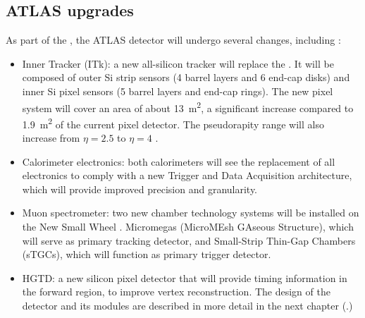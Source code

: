 \subsection{ATLAS upgrades}\label{subsec:ATLAS_upgrades}

As part of the , the ATLAS detector will undergo several changes, including \cite{MANGHI2024169917}: %

\begin{itemize}
    \item Inner Tracker (ITk): a new all-silicon tracker will replace the . It will be composed of outer Si strip sensors (4 barrel layers and 6 end-cap disks) and inner Si pixel sensors (5 barrel layers and end-cap rings). The new pixel system will cover an area of about \qty{13}{\meter^2}, a significant increase compared to \qty{1.9}{\meter^2} of the current pixel detector. The pseudorapity range will also increase from $\eta=2.5$ to $\eta=4$ \cite{Buttar:2024imj}.
    \item Calorimeter electronics: both calorimeters will see the replacement of all electronics to comply with a new Trigger and Data Acquisition architecture, which will provide improved precision and granularity. 
    \item Muon spectrometer: two new chamber technology systems \cite{2106380} will be installed on the New Small Wheel \cite{Kawamoto:2013udg}. Micromegas (MicroMEsh GAseous Structure), which will serve as primary tracking detector, and Small-Strip Thin-Gap Chambers (sTGCs), which will function as primary trigger detector.
    \item HGTD: a new silicon pixel detector that will provide timing information in the forward region, to improve vertex reconstruction. The design of the detector and its modules are described in more detail in the next chapter (.)
\end{itemize}

